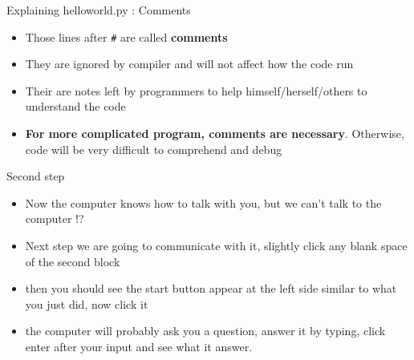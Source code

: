 \documentclass[10pt,xcolor={table,dvipsnames},t]{beamer}
\begin{document}
\begin{frame}{Explaining helloworld.py : Comments}
  \begin{itemize}
    \item Those lines after \texttt{\#} are called \textbf{comments}
    \item They are ignored by compiler and will not affect how the code run
    \item Their are notes left by programmers to help himself/herself/others to understand the code 
    \item \textbf{For more complicated program, comments are necessary}. Otherwise, code will be very difficult to comprehend and debug
  \end{itemize}
\end{frame}

\begin{frame}[fragile]{Second step}
  \begin{itemize}
    \item Now the computer knows how to talk with you, but we can't talk to the computer !?
    \item Next step we are going to communicate with it, slightly click any blank space of the second block
    \item then you should see the start button appear at the left side similar to what you just did, now click it
    \item the computer will probably ask you a question, answer it by typing, click enter after your input and see what it answer.
  \end{itemize}
\end{frame}
\end{document}
